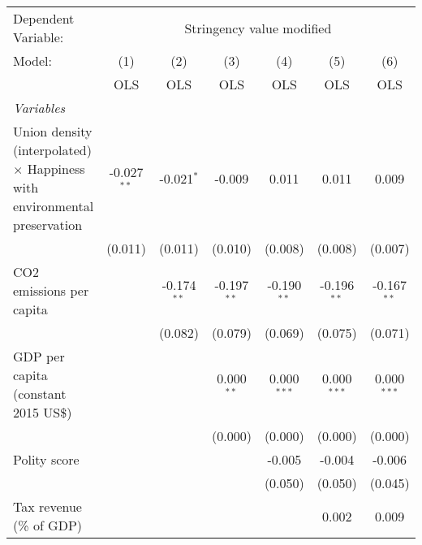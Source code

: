 
\begingroup
\centering
\begin{tabular}{lcccccc}
   \toprule
   Dependent Variable: & \multicolumn{6}{c}{Stringency value modified}\\
   Model:                                                                           & (1)           & (2)           & (3)           & (4)           & (5)           & (6)\\  
                                                                                    &  OLS          & OLS           & OLS           & OLS           & OLS           & OLS\\  
   \midrule
   \emph{Variables}\\
   Union density (interpolated) $\times$ Happiness with environmental preservation  & -0.027$^{**}$ & -0.021$^{*}$  & -0.009        & 0.011         & 0.011         & 0.009\\   
                                                                                    & (0.011)       & (0.011)       & (0.010)       & (0.008)       & (0.008)       & (0.007)\\   
   CO2 emissions per capita                                                         &               & -0.174$^{**}$ & -0.197$^{**}$ & -0.190$^{**}$ & -0.196$^{**}$ & -0.167$^{**}$\\   
                                                                                    &               & (0.082)       & (0.079)       & (0.069)       & (0.075)       & (0.071)\\   
   GDP per capita (constant 2015 US\$)                                              &               &               & 0.000$^{**}$  & 0.000$^{***}$ & 0.000$^{***}$ & 0.000$^{***}$\\   
                                                                                    &               &               & (0.000)       & (0.000)       & (0.000)       & (0.000)\\   
   Polity score                                                                     &               &               &               & -0.005        & -0.004        & -0.006\\   
                                                                                    &               &               &               & (0.050)       & (0.050)       & (0.045)\\   
   Tax revenue (\% of GDP)                                                          &               &               &               &               & 0.002         & 0.009\\   

\end{tabular}
